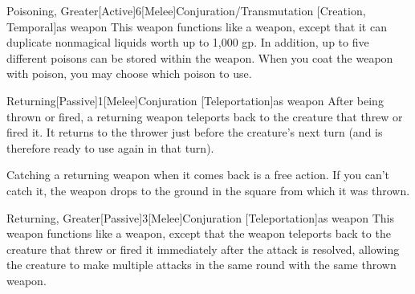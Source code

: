             \begin{magicitemdef}{Poisoning, Greater}[Active]{6}[Melee]{Conjuration/Transmutation [Creation, Temporal]}{as weapon}
                 This weapon functions like a  weapon, except that it can duplicate nonmagical liquids worth up to 1,000 gp.
                In addition, up to five different poisons can be stored within the weapon.
                When you coat the weapon with poison, you may choose which poison to use.
            \end{magicitemdef}

            \begin{magicitemdef}{Returning}[Passive]{1}[Melee]{Conjuration [Teleportation]}{as weapon}
                 After being thrown or fired, a returning weapon teleports back to the creature that threw or fired it.
                It returns to the thrower just before the creature's next turn (and is therefore ready to use again in that turn).

                Catching a returning weapon when it comes back is a free action.
                If you can't catch it, the weapon drops to the ground in the square from which it was thrown.
            \end{magicitemdef}

            \begin{magicitemdef}{Returning, Greater}[Passive]{3}[Melee]{Conjuration [Teleportation]}{as weapon}
                 This weapon functions like a  weapon, except that the weapon teleports back to the creature that threw or fired it immediately after the attack is resolved, allowing the creature to make multiple attacks in the same round with the same thrown weapon.
            \end{magicitemdef}

